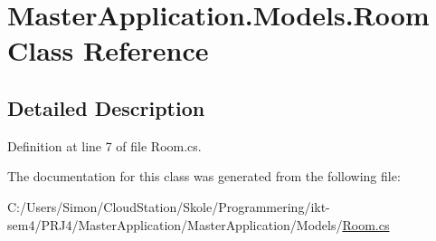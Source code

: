 \hypertarget{class_master_application_1_1_models_1_1_room}{}\section{Master\+Application.\+Models.\+Room Class Reference}
\label{class_master_application_1_1_models_1_1_room}


\subsection{Detailed Description}


Definition at line 7 of file Room.\+cs.



The documentation for this class was generated from the following file\+:\begin{DoxyCompactItemize}
\item 
C\+:/\+Users/\+Simon/\+Cloud\+Station/\+Skole/\+Programmering/ikt-\/sem4/\+P\+R\+J4/\+Master\+Application/\+Master\+Application/\+Models/\mbox{\hyperlink{_master_application_2_master_application_2_models_2_room_8cs}{Room.\+cs}}\end{DoxyCompactItemize}
